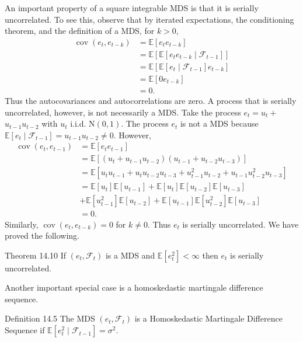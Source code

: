 \documentclass[10pt]{article}
\begin{document}
An important property of a square integrable MDS is that it is serially uncorrelated. To see this, observe that by iterated expectations, the conditioning theorem, and the definition of a MDS, for $k>0$,
$$
\begin{aligned}
\operatorname{cov}\left(e_{t}, e_{t-k}\right) &=\mathbb{E}\left[e_{t} e_{t-k}\right] \\
&=\mathbb{E}\left[\mathbb{E}\left[e_{t} e_{t-k} \mid \mathscr{F}_{t-1}\right]\right] \\
&=\mathbb{E}\left[\mathbb{E}\left[e_{t} \mid \mathscr{F}_{t-1}\right] e_{t-k}\right] \\
&=\mathbb{E}\left[0 e_{t-k}\right] \\
&=0 .
\end{aligned}
$$
Thus the autocovariances and autocorrelations are zero. A process that is serially uncorrelated, however, is not necessarily a MDS. Take the process $e_{t}=u_{t}+$ $u_{t-1} u_{t-2}$ with $u_{t}$ i.i.d. $\mathrm{N}(0,1)$. The process $e_{t}$ is not a MDS because $\mathbb{E}\left[e_{t} \mid \mathscr{F}_{t-1}\right]=u_{t-1} u_{t-2} \neq 0$. However,
$$
\begin{aligned}
\operatorname{cov}\left(e_{t}, e_{t-1}\right) &=\mathbb{E}\left[e_{t} e_{t-1}\right] \\
&=\mathbb{E}\left[\left(u_{t}+u_{t-1} u_{t-2}\right)\left(u_{t-1}+u_{t-2} u_{t-3}\right)\right] \\
&=\mathbb{E}\left[u_{t} u_{t-1}+u_{t} u_{t-2} u_{t-3}+u_{t-1}^{2} u_{t-2}+u_{t-1} u_{t-2}^{2} u_{t-3}\right] \\
&=\mathbb{E}\left[u_{t}\right] \mathbb{E}\left[u_{t-1}\right]+\mathbb{E}\left[u_{t}\right] \mathbb{E}\left[u_{t-2}\right] \mathbb{E}\left[u_{t-3}\right] \\
&+\mathbb{E}\left[u_{t-1}^{2}\right] \mathbb{E}\left[u_{t-2}\right]+\mathbb{E}\left[u_{t-1}\right] \mathbb{E}\left[u_{t-2}^{2}\right] \mathbb{E}\left[u_{t-3}\right] \\
&=0 .
\end{aligned}
$$
Similarly, $\operatorname{cov}\left(e_{t}, e_{t-k}\right)=0$ for $k \neq 0$. Thus $e_{t}$ is serially uncorrelated. We have proved the following.

Theorem 14.10 If $\left(e_{t}, \mathscr{F}_{t}\right)$ is a MDS and $\mathbb{E}\left[e_{t}^{2}\right]<\infty$ then $e_{t}$ is serially uncorrelated.

Another important special case is a homoskedastic martingale difference sequence.

Definition 14.5 The MDS $\left(e_{t}, \mathscr{F}_{t}\right)$ is a Homoskedastic Martingale Difference Sequence if $\mathbb{E}\left[e_{t}^{2} \mid \mathscr{F}_{t-1}\right]=\sigma^{2}$.
\end{document}
